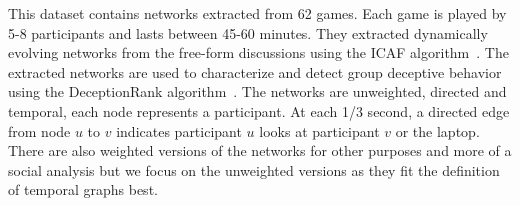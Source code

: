 This dataset contains networks extracted from 62 games.
Each game is played by 5-8 participants and lasts between 45-60 minutes.
They extracted dynamically evolving networks from the free-form discussions using the ICAF algorithm~\cite{f2f-bai2019predicting}.
The extracted networks are used to characterize and detect group deceptive behavior using the DeceptionRank algorithm~\cite{f2f-kumar2021deception}.
The networks are unweighted, directed and temporal, each node represents a participant.
At each 1/3 second, a directed edge from node $u$ to $v$ indicates participant $u$ looks at participant $v$ or the laptop.
There are also weighted versions of the networks for other purposes and more of a social analysis but we focus on the unweighted versions as they fit the definition of temporal graphs best.